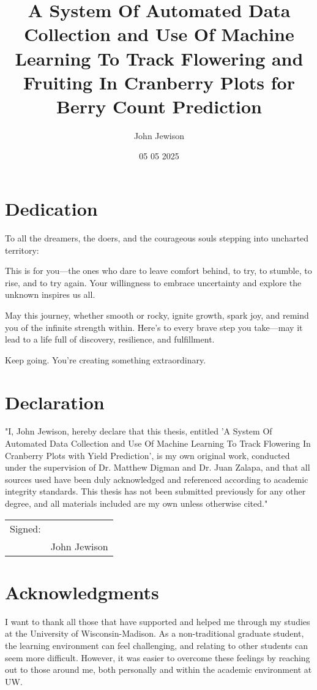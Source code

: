 \documentclass[11pt]{report}
\title{A System Of Automated Data Collection and Use Of Machine Learning To Track Flowering and Fruiting In Cranberry Plots for Berry Count Prediction }
\author{John Jewison}
\date{05 05 2025}
\begin{document}



\doublespacing

\chapter*{Dedication}

To all the dreamers, the doers, and the courageous souls stepping into uncharted territory:

This is for you—the ones who dare to leave comfort behind, to try, to stumble, to rise, and to try again. Your willingness to embrace uncertainty and explore the unknown inspires us all.

May this journey, whether smooth or rocky, ignite growth, spark joy, and remind you of the infinite strength within. Here's to every brave step you take—may it lead to a life full of discovery, resilience, and fulfillment.

Keep going. You're creating something extraordinary.

 

\chapter*{Declaration}

"I, John Jewison, hereby declare that this thesis, entitled 'A System Of Automated Data Collection and Use Of Machine Learning To Track Flowering In Cranberry Plots with Yield Prediction', is my own original work, conducted under the supervision of Dr. Matthew Digman and Dr. Juan Zalapa, and that all sources used have been duly acknowledged and referenced according to academic integrity standards. This thesis has not been submitted previously for any other degree, and all materials included are my own unless otherwise cited."

  \vspace{0.5cm}
\begin{tabular}{@{}p{.5in}p{4in}@{}}
Signed: & \hrulefill \\
& John Jewison \\
\end{tabular}

\chapter*{Acknowledgments}

I want to thank all those that have supported and helped me through my studies at the University of Wisconsin-Madison. As a non-traditional graduate student, the learning environment can feel challenging, and relating to other students can seem more difficult. However, it was easier to overcome these feelings by reaching out to those around me, both personally and within the academic environment at UW.
\end{document}
